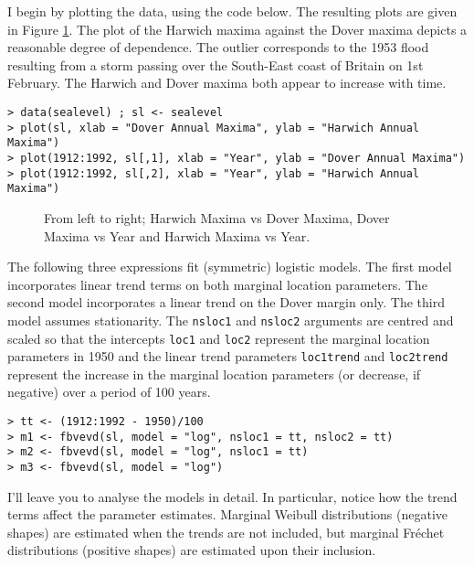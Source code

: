 \documentclass[11pt,a4paper]{article}
\begin{document}
I begin by plotting the data, using the code below. 
The resulting plots are given in Figure \ref{seadata}.
The plot of the Harwich maxima against the Dover maxima depicts a reasonable degree of dependence.
The outlier corresponds to the 1953 flood resulting from a storm passing over the South-East coast of Britain on 1st February.
The Harwich and Dover maxima both appear to increase with time.

\begin{verbatim}
> data(sealevel) ; sl <- sealevel
> plot(sl, xlab = "Dover Annual Maxima", ylab = "Harwich Annual Maxima")
> plot(1912:1992, sl[,1], xlab = "Year", ylab = "Dover Annual Maxima")
> plot(1912:1992, sl[,2], xlab = "Year", ylab = "Harwich Annual Maxima")
\end{verbatim}

\begin{figure}
\begin{center}
\vspace{-1.5cm}
\hspace{0cm}
\hspace{0cm}
\end{center} 
\caption{From left to right; Harwich Maxima vs Dover Maxima, Dover Maxima vs Year and Harwich Maxima vs Year.}
\label{seadata}
\end{figure}

The following three expressions fit (symmetric) logistic models. 
The first model incorporates linear trend terms on both marginal location parameters.
The second model incorporates a linear trend on the Dover margin only.
The third model assumes stationarity. 
 The \verb+nsloc1+ and \verb+nsloc2+ arguments are centred and scaled so that the intercepts \verb+loc1+ and \verb+loc2+ represent the marginal location parameters in 1950 and the linear trend parameters \verb+loc1trend+ and \verb+loc2trend+ represent the increase in the marginal location parameters (or decrease, if negative) over a period of 100 years.

\begin{verbatim}
> tt <- (1912:1992 - 1950)/100
> m1 <- fbvevd(sl, model = "log", nsloc1 = tt, nsloc2 = tt)
> m2 <- fbvevd(sl, model = "log", nsloc1 = tt)
> m3 <- fbvevd(sl, model = "log")
\end{verbatim}

I'll leave you to analyse the models in detail.
In particular, notice how the trend terms affect the parameter estimates.
Marginal Weibull distributions (negative shapes) are estimated when the trends are not included, but marginal Fr\'{e}chet distributions (positive shapes) are estimated upon their inclusion.
\end{document}

